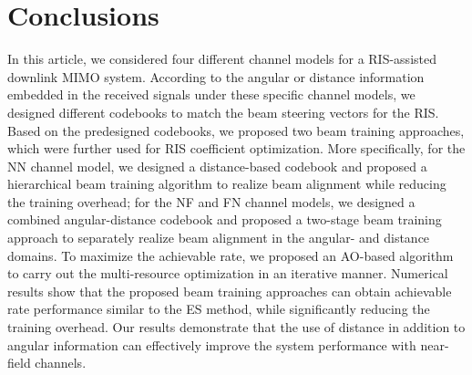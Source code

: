 \documentclass[lettersize, journal]{IEEEtran}
\begin{document}
\section{Conclusions}
In this article, we considered four different channel models for a RIS-assisted downlink MIMO system. 
According to the angular or distance information embedded in the received signals under these specific channel models, we designed different codebooks to match the beam steering vectors for the RIS. 
Based on the predesigned codebooks, we proposed two beam training approaches,  which were further used for RIS coefficient optimization. 
More specifically, for the NN channel model, we designed a distance-based codebook and proposed a hierarchical beam training algorithm to realize beam alignment while reducing the training overhead; for the NF and FN channel models, we designed a combined angular-distance codebook and proposed a two-stage beam training approach to separately realize beam alignment in the angular- and distance domains.
To maximize the achievable rate, we proposed an AO-based algorithm to carry out the multi-resource optimization in an iterative manner. 
Numerical results show that the proposed beam training approaches can obtain achievable rate performance similar to the ES method, while significantly reducing the training overhead. Our results demonstrate that the use of distance in addition to angular information can effectively improve the system performance with near-field channels.


\balance



\end{document}
